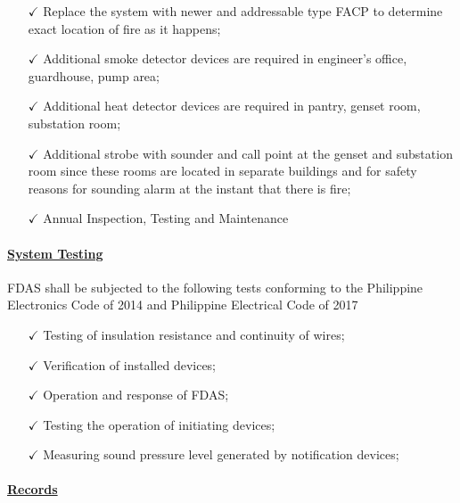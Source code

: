 \begin{itemize}
	\item [$\checkmark$] Replace the system with newer and addressable type FACP to determine exact location of fire as it happens;
	
	\item[$\checkmark$] Additional smoke detector devices are required in engineer’s office, guardhouse, pump area;
	
	\item[$\checkmark$] Additional heat detector devices are required in pantry, genset room, substation room;
	
	\item[$\checkmark$] Additional strobe with sounder and call point  at the genset and substation room since these rooms are located in separate buildings and for safety reasons for sounding alarm at the instant that there is fire;
	
	\item [$\checkmark$]Annual Inspection, Testing and Maintenance
\end{itemize}


\paragraph{\underline{System Testing }}

FDAS shall be subjected to the following tests conforming to the Philippine Electronics Code of 2014 and Philippine Electrical Code of 2017
\begin{itemize}%
	\item [$\checkmark$] Testing of insulation resistance and continuity of wires;
	\item [$\checkmark$] Verification of installed devices;
	\item [$\checkmark$] Operation and response of FDAS;
	\item [$\checkmark$] Testing the operation of initiating devices;
	\item [$\checkmark$] Measuring sound pressure level generated by notification devices;
\end{itemize}


\paragraph{\underline{Records }}

